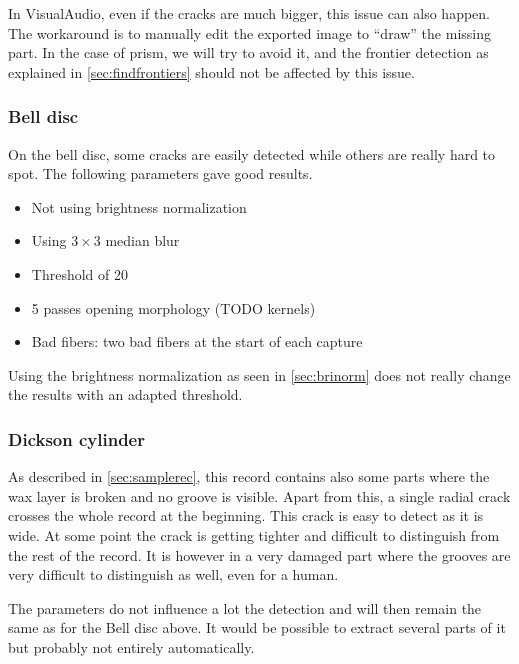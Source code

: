 In VisualAudio, even if the cracks are much bigger, this issue can also happen. The workaround is to manually edit the exported image to ``draw'' the missing part. In the case of \gls{prism}, we will try to avoid it, and the frontier detection as explained in \autoref{sec:findfrontiers} should not be affected by this issue.

\subsubsection{Bell disc}

On the bell disc, some cracks are easily detected while others are really hard to spot. The following parameters gave good results.

\begin{itemize}
\item Not using brightness normalization
\item Using $3 \times 3$ median blur
\item Threshold of 20
\item 5 passes opening morphology (TODO kernels)
\item Bad fibers: two bad fibers at the start of each capture
\end{itemize}

Using the brightness normalization as seen in \autoref{sec:brinorm} does not really change the results with an adapted threshold.

\subsubsection{Dickson cylinder}

As described in \autoref{sec:samplerec}, this record contains also some parts where the wax layer is broken and no groove is visible. Apart from this, a single radial crack crosses the whole record at the beginning. This crack is easy to detect as it is wide. At some point the crack is getting tighter and difficult to distinguish from the rest of the record. It is however in a very damaged part where the grooves are very difficult to distinguish as well, even for a human.

The parameters do not influence a lot the detection and will then remain the same as for the Bell disc above. It would be possible to extract several parts of it but probably not entirely automatically.


